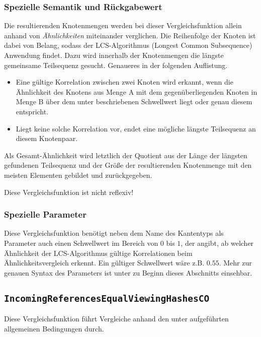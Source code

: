 \subsubsection*{Spezielle Semantik und Rückgabewert}
Die resultierenden Knotenmengen werden bei dieser Vergleichsfunktion allein anhand von \emph{Ähnlichkeiten} miteinander verglichen. Die Reihenfolge der Knoten ist dabei von Belang, sodass der LCS-Algorithmus (Longest Common Subsequence) Anwendung findet. Dazu wird innerhalb der Knotenmengen die längste gemeinsame Teilsequenz gesucht. Genaueres in der folgenden Auflistung.
\begin{itemize}
	\item Eine gültige Korrelation zwischen zwei Knoten wird erkannt, wenn die Ähnlichkeit des Knotens aus Menge A mit dem gegenüberliegenden Knoten in Menge B über dem unter  beschriebenen Schwellwert liegt oder genau diesem entspricht.
	\item Liegt keine solche Korrelation vor, endet eine mögliche längste Teilsequenz an diesem Knotenpaar.
\end{itemize}

Als Gesamt-Ähnlichkeit wird letztlich der Quotient aus der Länge der längsten gefundenen Teilsequenz und der Größe der resultierenden Knotenmenge mit den meisten Elementen gebildet und zurückgegeben.

 Diese Vergleichsfunktion ist nicht reflexiv!

\subsubsection*{Spezielle Parameter}
Diese Vergleichsfunktion benötigt neben dem Name des Kantentyps als Parameter auch einen Schwellwert im Bereich von $0$ bis $1$, der angibt, ab welcher Ähnlichkeit der LCS-Algorithmus gültige Korrelationen beim Ähnlichkeitsvergleich erkennt. Ein gültiger Schwellwert wäre z.B. $0.55$. Mehr zur genauen Syntax des Parameters ist unter  zu Beginn dieses Abschnitts einsehbar.


\newpage
%
%
\subsection{\texttt{IncomingReferencesEqualViewingHashesCO}}
Diese Vergleichsfunktion führt Vergleiche anhand den unter\mylinebreak{} aufgeführten allgemeinen Bedingungen durch.

